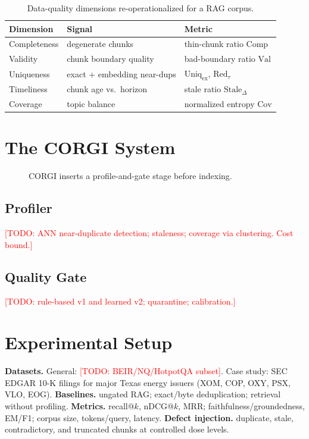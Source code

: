 \documentclass[conference]{IEEEtran}
\newcommand{\todo}[1]{\textcolor{red}{[TODO: #1]}}
\begin{document}
\begin{table}[t]
\caption{Data-quality dimensions re-operationalized for a RAG corpus.}
\label{tab:dims}
\centering
\begin{tabular}{@{}lll@{}}
\toprule
Dimension & Signal & Metric \\
\midrule
Completeness & degenerate chunks & thin-chunk ratio $\mathrm{Comp}$ \\
Validity & chunk boundary quality & bad-boundary ratio $\mathrm{Val}$ \\
Uniqueness & exact + embedding near-dups & $\mathrm{Uniq}_{\mathrm{ex}}$, $\mathrm{Red}_{\tau}$ \\
Timeliness & chunk age vs.\ horizon & stale ratio $\mathrm{Stale}_{\Delta}$ \\
Coverage & topic balance & normalized entropy $\mathrm{Cov}$ \\
\bottomrule
\end{tabular}
\end{table}

\section{The CORGI System}\label{sec:system}
\begin{figure}[t]
\centering
\caption{CORGI inserts a profile-and-gate stage before indexing.}
\label{fig:pipeline}
\end{figure}

\subsection{Profiler}
\todo{ANN near-duplicate detection; staleness; coverage via clustering. Cost bound.}
\subsection{Quality Gate}
\todo{rule-based v1 and learned v2; quarantine; calibration.}

\section{Experimental Setup}\label{sec:setup}
\textbf{Datasets.} General: \todo{BEIR/NQ/HotpotQA subset}. Case study: SEC EDGAR 10-K
filings for major Texas energy issuers (XOM, COP, OXY, PSX, VLO, EOG).
\textbf{Baselines.} ungated RAG; exact/byte deduplication; retrieval without profiling.
\textbf{Metrics.} recall@$k$, nDCG@$k$, MRR; faithfulness/groundedness, EM/F1; corpus size,
tokens/query, latency. \textbf{Defect injection.} duplicate, stale, contradictory, and
truncated chunks at controlled dose levels.
\end{document}
